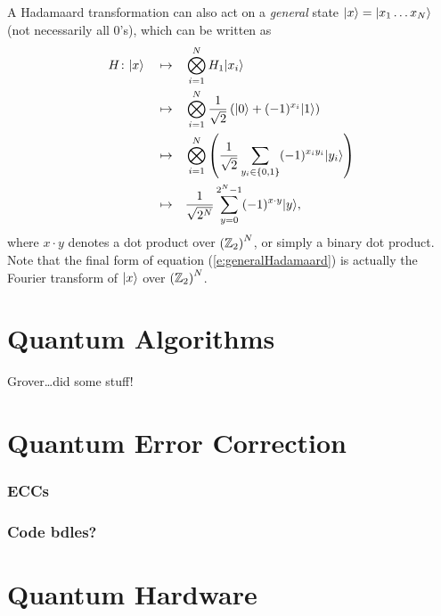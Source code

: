 A Hadamaard transformation can also act on a {\sl general} state 
${|{x}\rangle}={|{x_1\ldots x_N}\rangle}$
(not necessarily all 0's), which can be written as
\begin{equation}
\begin{split}
H\colon{|{x}\rangle}\quad\mapsto\quad&
\bigotimes_{i=1}^N 
H_1{|{x_i}\rangle}\\
\quad\mapsto\quad&
\bigotimes_{i=1}^N 
\frac{1}{\sqrt{2}} \left( {|{0}\rangle} + (-1)^{x_i}{|{1}\rangle} \right)\\
\quad\mapsto\quad&
\bigotimes_{i=1}^N 
\left(\frac{1}{\sqrt{2}} \sum_{y_i\in\lbrace 0,1\rbrace} 
(-1)^{x_iy_i}{|{y_i}\rangle}\right)\\
\quad\mapsto\quad&
\frac{1}{\sqrt{2^N}} \sum_{y=0}^{2^N-1} (-1)^{x\cdot y}{|{y}\rangle},
\end{split}
\label{e:generalHadamaard}
\end{equation}
where $x\cdot y$ denotes a dot product over $\left({\mathbb{Z}}_2\right)^N$, or
simply a binary dot product.  Note that the final form of equation
(\ref{e:generalHadamaard}) is actually the Fourier transform of ${|{x}\rangle}$
over $\left({\mathbb{Z}}_2\right)^N$.



\section{Quantum Algorithms}
\label{sec:quantCompAlgs}

Grover\cite{Grover:96}\dots did some stuff!

%

\section{Quantum Error Correction}

\subsubsection{ECCs}
\subsubsection{Code bdles?}

\section{Quantum Hardware}
